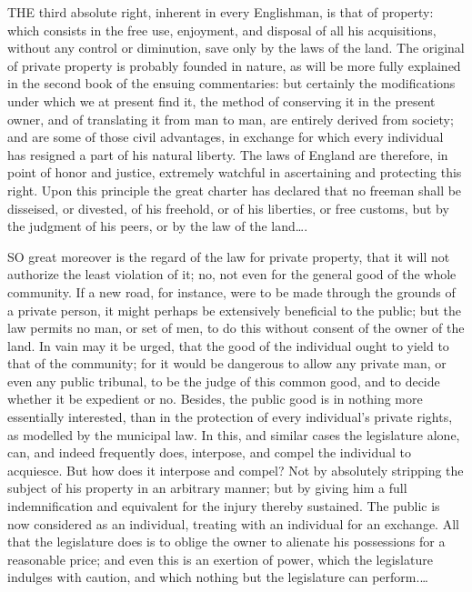 
THE third absolute right, inherent in every Englishman, is that of property:
which consists in the free use, enjoyment, and disposal of all his
acquisitions, without any control or diminution, save only by the laws of the
land. The original of private property is probably founded in nature, as will
be more fully explained in the second book of the ensuing commentaries: but
certainly the modifications under which we at present find it, the method of
conserving it in the present owner, and of translating it from man to man, are
entirely derived from society; and are some of those civil advantages, in
exchange for which every individual has resigned a part of his natural liberty.
The laws of England are therefore, in point of honor and justice, extremely
watchful in ascertaining and protecting this right. Upon this principle the
great charter has declared that no freeman shall be disseised, or divested, of
his freehold, or of his liberties, or free customs, but by the judgment of his
peers, or by the law of the land\ldots.


SO great moreover is the regard of the law for private property, that it will
not authorize the least violation of it; no, not even for the general good of
the whole community. If a new road, for instance, were to be made through the
grounds of a private person, it might perhaps be extensively beneficial to the
public; but the law permits no man, or set of men, to do this without consent
of the owner of the land. In vain may it be urged, that the good of the
individual ought to yield to that of the community; for it would be dangerous
to allow any private man, or even any public tribunal, to be the judge of this
common good, and to decide whether it be expedient or no. Besides, the public
good is in nothing more essentially interested, than in the protection of every
individual's private rights, as modelled by the municipal law. In this, and
similar cases the legislature alone, can, and indeed frequently does,
interpose, and compel the individual to acquiesce. But how does it interpose
and compel? Not by absolutely stripping the subject of his property in an
arbitrary manner; but by giving him a full indemnification and equivalent for
the injury thereby sustained. The public is now considered as an individual,
treating with an individual for an exchange. All that the legislature does is
to oblige the owner to alienate his possessions for a reasonable price; and
even this is an exertion of power, which the legislature indulges with caution,
and which nothing but the legislature can perform.\ldots

